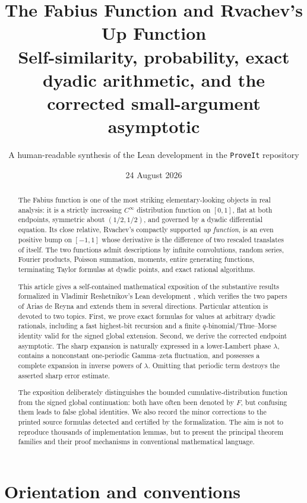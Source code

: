 \documentclass[11pt]{article}
\title{\textbf{The Fabius Function and Rvachev's Up Function}\\[0.5em]
\large Self-similarity, probability, exact dyadic arithmetic, and the corrected small-argument asymptotic}
\author{A human-readable synthesis of the Lean development in the \texttt{ProveIt} repository}
\date{24 August 2026}
\numberwithin{equation}{section}
\theoremstyle{definition}
\theoremstyle{remark}
\begin{document}
\maketitle

\begin{abstract}
The Fabius function is one of the most striking elementary-looking objects in real analysis: it is a strictly increasing $C^\infty$ distribution function on $[0,1]$, flat at both endpoints, symmetric about $(1/2,1/2)$, and governed by a dyadic differential equation.  Its close relative, Rvachev's compactly supported \emph{up function}, is an even positive bump on $[-1,1]$ whose derivative is the difference of two rescaled translates of itself.  The two functions admit descriptions by infinite convolutions, random series, Fourier products, Poisson summation, moments, entire generating functions, terminating Taylor formulas at dyadic points, and exact rational algorithms.

This article gives a self-contained mathematical exposition of the substantive results formalized in Vladimir Reshetnikov's Lean development \cite{p3:ProveIt}, which verifies the two papers of Arias de Reyna \cite{p3:Arias05442,p3:Arias06487} and extends them in several directions.  Particular attention is devoted to two topics.  First, we prove exact formulas for values at arbitrary dyadic rationals, including a fast highest-bit recursion and a finite $q$-binomial/Thue--Morse identity valid for the signed global extension.  Second, we derive the corrected endpoint asymptotic.  The sharp expansion is naturally expressed in a lower-Lambert phase $\lambda$, contains a nonconstant one-periodic Gamma--zeta fluctuation, and possesses a complete expansion in inverse powers of $\lambda$.  Omitting that periodic term destroys the asserted sharp error estimate.

The exposition deliberately distinguishes the bounded cumulative-distribution function from the signed global continuation: both have often been denoted by $F$, but confusing them leads to false global identities.  We also record the minor corrections to the printed source formulas detected and certified by the formalization.  The aim is not to reproduce thousands of implementation lemmas, but to present the principal theorem families and their proof mechanisms in conventional mathematical language.
\end{abstract}

\tableofcontents
\newpage

\section{Orientation and conventions}
\end{document}
